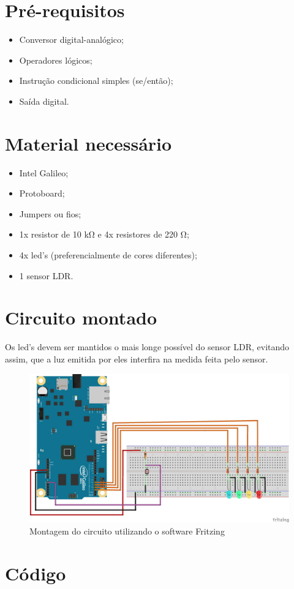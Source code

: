\section{Pré-requisitos}
\begin{itemize}
                \item Conversor digital-analógico;
                \item Operadores lógicos;
				\item Instrução condicional simples (se/então);
                \item Saída digital.
\end{itemize}
 
\section{Material necessário}

\begin{itemize}
	\item Intel Galileo;
	\item Protoboard;
	\item Jumpers ou fios;
	\item 1x resistor de 10 k$\mathrm{\Omega}$ e 4x resistores de 220 $\mathrm{\Omega}$;
	\item 4x led's (preferencialmente de cores diferentes);
	\item 1 sensor LDR.
\end{itemize}

\section{Circuito montado}

Os led's devem ser mantidos o mais longe possível do sensor LDR, evitando assim, que a luz emitida por eles interfira na medida feita pelo sensor.

\begin{figure}[!htb]
\centering
\includegraphics[scale = 0.6]{lab2_charles/nivel_iluminacao_bb.png}
\caption{Montagem do circuito utilizando o software Fritzing}
\label{circuito}
\end{figure}

\section{Código}

\lstset{inputencoding=utf8/latin1, breaklines = true}


